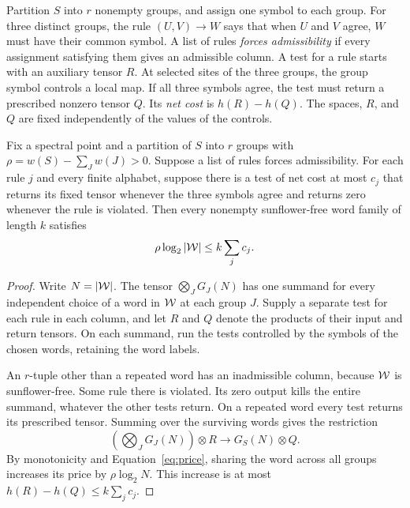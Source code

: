Partition \(S\) into \(r\) nonempty groups, and assign one symbol to
each group. For three distinct groups, the rule \((U,V)\to W\) says
that when \(U\) and \(V\) agree, \(W\) must have their common symbol.
A list of rules \emph{forces admissibility} if every assignment
satisfying them gives an admissible column. A test for a rule starts
with an auxiliary tensor \(R\). At selected sites of the three groups,
the group symbol controls a local map. If all three symbols agree, the
test must return a prescribed nonzero tensor \(Q\). Its \emph{net cost}
is \(h(R)-h(Q)\). The spaces, \(R\), and \(Q\) are fixed independently
of the values of the controls.

\begin{proposition}\label{prop:comparison}
Fix a spectral point and a partition of \(S\) into \(r\) groups with
\(\rho=w(S)-\sum_J w(J)>0\). Suppose a list of rules forces admissibility.
For each rule \(j\) and every finite alphabet, suppose there is a test
of net cost at most \(c_j\) that returns its fixed tensor whenever the
three symbols agree and returns zero whenever the rule is violated.
Then every nonempty sunflower-free word family of length \(k\) satisfies
\[
                 \rho\log_2|\mathcal W|\le k\sum_j c_j .
\]
\end{proposition}

\begin{proof}
Write \(N=|\mathcal W|\). The tensor \(\bigotimes_J G_J(N)\) has one summand
for every independent choice of a word in \(\mathcal W\) at each group \(J\).
Supply a separate test for each rule in each column, and let \(R\) and
\(Q\) denote the products of their input and return tensors. On each
summand, run the tests controlled by the symbols of the chosen words,
retaining the word labels.

An \(r\)-tuple other than a repeated word has an inadmissible column,
because \(\mathcal W\) is sunflower-free. Some rule there is violated. Its
zero output kills the entire summand, whatever the other tests return.
On a repeated word every test returns its prescribed tensor. Summing
over the surviving words gives the restriction
\[
        \left(\bigotimes_J G_J(N)\right)\otimes R
                 \longrightarrow G_S(N)\otimes Q .
\]
By monotonicity and Equation~\eqref{eq:price}, sharing the word across
all groups increases its price by \(\rho\log_2 N\). This increase
is at most \(h(R)-h(Q)\le k\sum_j c_j\).
\end{proof}

